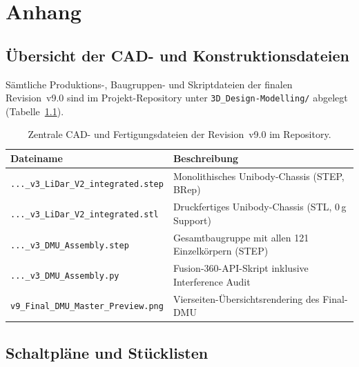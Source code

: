 \chapter{Anhang}
\label{chap:anhang}

\section{Übersicht der CAD- und Konstruktionsdateien}
\label{sec:anhang_cad}

Sämtliche Produktions-, Baugruppen- und Skriptdateien der finalen Revision~v9.0 sind im Projekt-Repository unter \texttt{3D\_Design-Modelling/} abgelegt (Tabelle~\ref{tab:anhang_dateien}).

\begin{table}[htbp]
  \centering
  \caption{Zentrale CAD- und Fertigungsdateien der Revision~v9.0 im Repository.}
  \label{tab:anhang_dateien}
  \begin{tabular}{@{}ll@{}}
    \toprule
    \textbf{Dateiname} & \textbf{Beschreibung} \\
    \midrule
    \texttt{...\_v3\_LiDar\_V2\_integrated.step} & Monolithisches Unibody-Chassis (STEP, BRep) \\
    \texttt{...\_v3\_LiDar\_V2\_integrated.stl} & Druckfertiges Unibody-Chassis (STL, 0\,g Support) \\
    \texttt{...\_v3\_DMU\_Assembly.step} & Gesamtbaugruppe mit allen 121 Einzelkörpern (STEP) \\
    \texttt{...\_v3\_DMU\_Assembly.py} & Fusion-360-API-Skript inklusive Interference Audit \\
    \texttt{v9\_Final\_DMU\_Master\_Preview.png} & Vierseiten-Übersichtsrendering des Final-DMU \\
    \bottomrule
  \end{tabular}
\end{table}

\section{Schaltpläne und Stücklisten}
\label{sec:anhang_schaltplaene}

